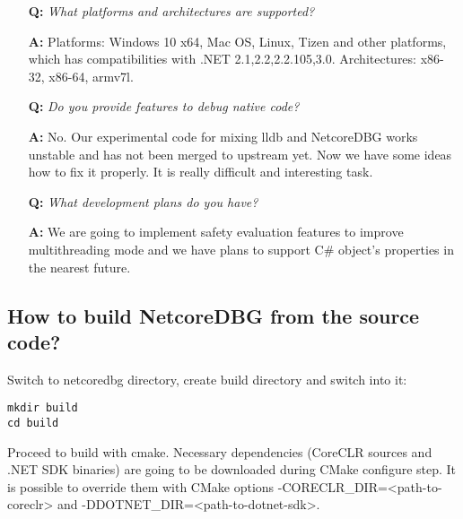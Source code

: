 \documentclass[a4paper,12pt]{article}
\newenvironment{nobr}{\begin{minipage}{\textwidth}\setlength\parskip{1em}
}{\end{minipage}\ignorespacesafterend}
\begin{document}
\begin{nobr}
\begin{itemize}
\item[\textbf{Q:}] \emph{What platforms and architectures are supported?}
\item[\textbf{A:}] Platforms: Windows 10 x64, Mac OS, Linux, Tizen and other platforms, which has compatibilities with .NET 2.1,2.2,2.2.105,3.0. Architectures: x86-32, x86-64, armv7l.
\end{itemize}
\medskip
\end{nobr}

\begin{nobr}
\begin{itemize}
\item[\textbf{Q:}] \emph{Do you provide features to debug native code?}
\item[\textbf{A:}] No. Our experimental code for mixing lldb and NetcoreDBG works unstable and has not been merged to upstream yet. Now we have some ideas how to fix it properly. It is really difficult and interesting task.
\end{itemize}
\medskip
\end{nobr}

\begin{nobr}
\begin{itemize}
\item[\textbf{Q:}] \emph{What development plans do you have?}
\item[\textbf{A:}] We are going to implement safety evaluation features to improve multithreading mode and we have plans to support C\# object's properties in the nearest future.
\end{itemize}
\medskip
\end{nobr}

\newpage
\subsection{How to build NetcoreDBG from the source code?}
Switch to netcoredbg directory, create build directory and switch into it:

\begin{lstlisting}[style=commandline,numbers=none]
mkdir build
cd build
\end{lstlisting}

Proceed to build with cmake.
Necessary dependencies (CoreCLR sources and .NET SDK binaries) are going to be downloaded during CMake configure step. It is possible to override them with CMake options -CORECLR\_DIR=<path-to-coreclr> and -DDOTNET\_DIR=<path-to-dotnet-sdk>.
\end{document}

